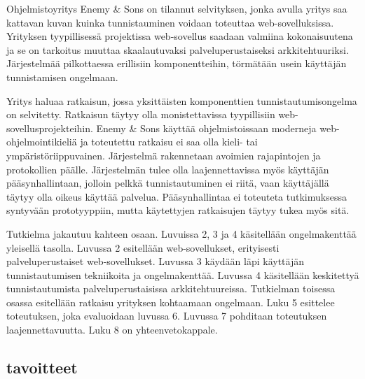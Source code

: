 Ohjelmistoyritys Enemy \& Sons on tilannut selvityksen, jonka avulla yritys saa kattavan kuvan kuinka tunnistauminen voidaan toteuttaa web-sovelluksissa. Yrityksen tyypillisessä projektissa web-sovellus saadaan valmiina kokonaisuutena ja se on tarkoitus muuttaa skaalautuvaksi palveluperustaiseksi arkkitehtuuriksi. Järjestelmää pilkottaessa erillisiin komponentteihin, törmätään usein käyttäjän tunnistamisen ongelmaan.

Yritys haluaa ratkaisun, jossa yksittäisten komponenttien tunnistautumisongelma on selvitetty. Ratkaisun täytyy olla monistettavissa tyypillisiin web-sovellusprojekteihin. Enemy \& Sons käyttää ohjelmistoissaan moderneja web-ohjelmointikieliä ja toteutettu ratkaisu ei saa olla kieli- tai ympäristöriippuvainen. Järjestelmä rakennetaan avoimien rajapintojen ja protokollien päälle. Järjestelmän tulee olla laajennettavissa myös käyttäjän pääsynhallintaan, jolloin pelkkä tunnistautuminen ei riitä, vaan käyttäjällä täytyy olla oikeus käyttää palvelua. Pääsynhallintaa ei toteuteta tutkimuksessa syntyvään prototyyppiin, mutta käytettyjen ratkaisujen täytyy tukea myös sitä.

Tutkielma jakautuu kahteen osaan. Luvuissa 2, 3 ja 4 käsitellään ongelmakenttää yleisellä tasolla. Luvussa 2 esitellään web-sovellukset, erityisesti palveluperustaiset web-sovellukset. Luvussa 3 käydään läpi käyttäjän tunnistautumisen tekniikoita ja ongelmakenttää. Luvussa 4 käsitellään keskitettyä tunnistautumista palveluperustaisissa arkkitehtuureissa. Tutkielman toisessa osassa esitellään ratkaisu yrityksen kohtaamaan ongelmaan. Luku 5 esittelee toteutuksen, joka evaluoidaan luvussa 6. Luvussa 7 pohditaan toteutuksen laajennettavuutta. Luku 8 on yhteenvetokappale.


\subsection{tavoitteet}

